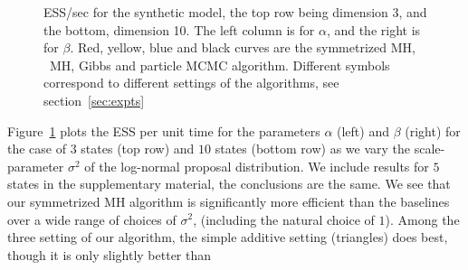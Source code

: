 \begin{figure}
\begin{minipage}[!hp]{0.8\linewidth}
    \vspace{-0 in}
  \end{minipage}
    \caption{ESS/sec for the synthetic  model, the top row being dimension 3, and the bottom,
      dimension 10. The left column is for $\alpha$, and the 
    right is for $\beta$. Red, yellow, blue and black curves are the symmetrized MH,
  \naive\ MH, Gibbs and particle MCMC algorithm. Different symbols correspond
to different settings of the algorithms, see section~\ref{sec:expts}}
     \label{fig:ESS_EXP_D10}
  \end{figure}
  Figure~\ref{fig:ESS_EXP_D10} plots the ESS per unit time for the parameters 
  $\alpha$ (left) and $\beta$ (right) for the
  case of $3$ states (top row) and $10$ states (bottom row) as we vary the scale-parameter $\sigma^2$ of the
  log-normal proposal distribution. We include results for $5$ states in the 
  supplementary material, the conclusions are the same. 
We see that our symmetrized MH algorithm is significantly more efficient 
than the baselines over a wide range of choices of $\sigma^2$, 
(including the natural choice of $1$).
Among the three setting of our algorithm, the simple additive setting
 ({triangles}) does best, though it is only slightly better than 

